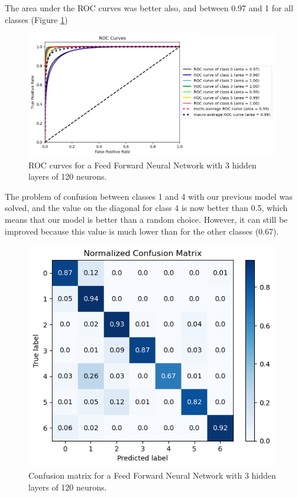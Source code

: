 \documentclass[letterpaper,12pt]{article}
\begin{document}
The area under the ROC curves was better also, and between 0.97 and 1 for all classes (Figure \ref{FFNN2_ROC})
\begin{figure}[H]
    \centering
    \includegraphics[width=11cm]{ROC9.png}
    \caption{\centering ROC curves for a Feed Forward Neural Network with 3 hidden layers of 120 neurons.}
    \label{FFNN2_ROC}
\end{figure}

The problem of confusion between classes 1 and 4 with our previous model was solved, and the value on the diagonal for class 4 is now better than 0.5, which means that our model is better than a random choice. However, it can still be improved because this value is much lower than for the other classes (0.67).
\begin{figure}[H]
    \centering
    \includegraphics[width=11cm]{CM9.png}
    \caption{\centering Confusion matrix for a Feed Forward Neural Network with 3 hidden layers of 120 neurons.}
    \label{FFNN2_CM}
\end{figure}
\end{document}
